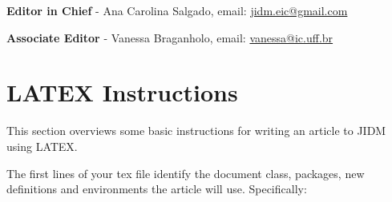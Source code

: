 \documentclass[jidm,a4paper]{jidm} %
\begin{document}
\textbf{Editor in Chief} - Ana Carolina Salgado, email: \url{jidm.eic@gmail.com}

\textbf{Associate Editor} - Vanessa Braganholo, email: \url{vanessa@ic.uff.br}




\appendix
\section{LATEX Instructions}

This section overviews some basic instructions for writing an article to JIDM using LATEX.


The first lines of your tex file identify the document class, packages, new definitions and environments the article will use.
Specifically:
\end{document}
